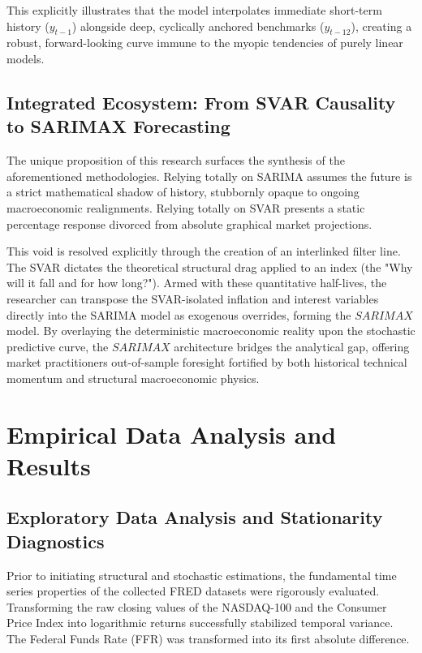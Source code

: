 \documentclass[12pt,a4paper]{report}
\begin{document}
This explicitly illustrates that the model interpolates immediate short-term history ($y_{t-1}$) alongside deep, cyclically anchored benchmarks ($y_{t-12}$), creating a robust, forward-looking curve immune to the myopic tendencies of purely linear models.

\section{Integrated Ecosystem: From SVAR Causality to SARIMAX Forecasting}
The unique proposition of this research surfaces the synthesis of the aforementioned methodologies. Relying totally on SARIMA assumes the future is a strict mathematical shadow of history, stubbornly opaque to ongoing macroeconomic realignments. Relying totally on SVAR presents a static percentage response divorced from absolute graphical market projections. 

This void is resolved explicitly through the creation of an interlinked filter line. The SVAR dictates the theoretical structural drag applied to an index (the "Why will it fall and for how long?"). Armed with these quantitative half-lives, the researcher can transpose the SVAR-isolated inflation and interest variables directly into the SARIMA model as exogenous overrides, forming the $SARIMAX$ model. By overlaying the deterministic macroeconomic reality upon the stochastic predictive curve, the $SARIMAX$ architecture bridges the analytical gap, offering market practitioners out-of-sample foresight fortified by both historical technical momentum and structural macroeconomic physics.

\chapter{Empirical Data Analysis and Results}

\section{Exploratory Data Analysis and Stationarity Diagnostics}
Prior to initiating structural and stochastic estimations, the fundamental time series properties of the collected FRED datasets were rigorously evaluated. Transforming the raw closing values of the NASDAQ-100 and the Consumer Price Index into logarithmic returns successfully stabilized temporal variance. The Federal Funds Rate (FFR) was transformed into its first absolute difference.
\end{document}
